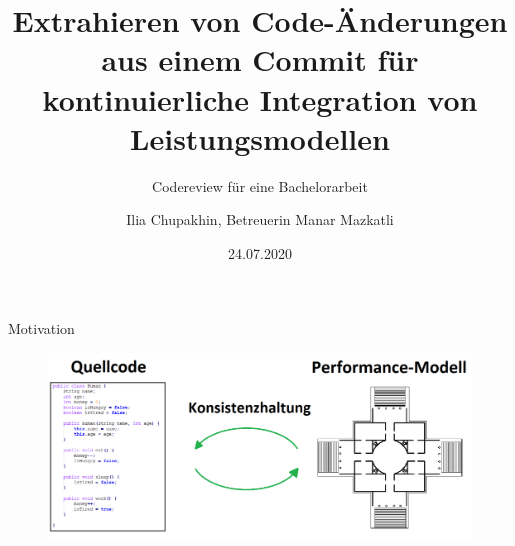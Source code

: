 \documentclass[18pt]{beamer}
\title{Extrahieren von Code-Änderungen aus einem Commit für kontinuierliche Integration von Leistungsmodellen}
\subtitle{Codereview für eine Bachelorarbeit}
\author{Ilia Chupakhin, Betreuerin Manar Mazkatli}
\date{24.07.2020}
\institute{Institut für Programmstrukturen und Datenorganisation}
\begin{document}

\begin{frame}
\titlepage
\end{frame}

%


\begin{frame}{Motivation}
\begin{figure}
\includegraphics[scale=0.3]{pictures/Konsistenzhaltung.png}
\end{figure}
\end{frame}
\end{document}
